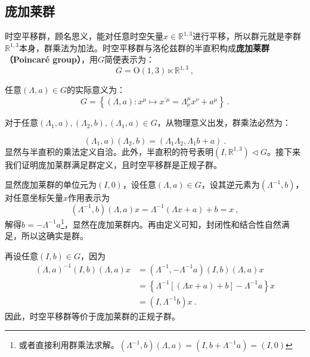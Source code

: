 

\begin{issues}
\end{issues}


\subsection{庞加莱群}
时空平移群，顾名思义，能对任意时空矢量$x\in \mathbb R^{1,3} $进行平移，所以群元就是李群$\mathbb R^{1,3}$本身，群乘法为加法。时空平移群与洛伦兹群的半直积构成\textbf{庞加莱群（Poincaré group）}，用$G$简便表示为：
\begin{equation}
G= \mathrm{O}(1,3) \ltimes\mathbb{R}^{1,3}~,
\end{equation}

任意$(\Lambda,a)\in G$的实际意义为：
\begin{equation}\label{eq_PoinGr_3}
G=\left\{(\Lambda, a): x^{\mu} \mapsto x^{\prime \mu}=\Lambda_{\nu}^{\mu} x^{\nu}+a^{\mu}\right\}~.
\end{equation}


对于任意$(\Lambda_1,a),(\Lambda_2,b),(\Lambda_1,a)\in G$，从物理意义出发，群乘法必然为：

\begin{equation}
(\Lambda_1,a)(\Lambda_2,b)=(\Lambda_1\Lambda_2,\Lambda_1b+a)~.
\end{equation}
显然与半直积的乘法定义自洽。此外，半直积的符号表明$(I,\mathbb R^{1,3})\vartriangleleft G$。接下来我们证明庞加莱群满足群定义，且时空平移群是正规子群。

显然庞加莱群的单位元为$(I,0)$，设任意$(\Lambda,a)\in G$，设其逆元素为$(\Lambda^{-1},b)$，对任意坐标矢量$x$作用表示为
\begin{equation}
(\Lambda^{-1},b)(\Lambda,a)x=\Lambda^{-1}(\Lambda x+a)+b=x~,
\end{equation}
解得$b=-\Lambda^{-1} a$\footnote{或者直接利用群乘法求解。$(\Lambda^{-1},b)(\Lambda,a)=(I,b+\Lambda^{-1}a)=(I,0)$}，显然在庞加莱群内。再由定义可知，封闭性和结合性自然满足，所以这确实是群。

再设任意$(I,b)\in G$，因为
\begin{equation}
\begin{aligned}
(\Lambda,a)^{-1}(I,b)(\Lambda,a)x&=(\Lambda^{-1},-\Lambda^{-1}a)(I,b)(\Lambda,a)x\\
&=\left\{\Lambda^{-1}\left [\left(\Lambda x+a \right)+b\right]-\Lambda^{-1}a\right\}x\\
&=(I,\Lambda^{-1}b)x~.
\end{aligned}
\end{equation}
因此，时空平移群等价于庞加莱群的正规子群。

